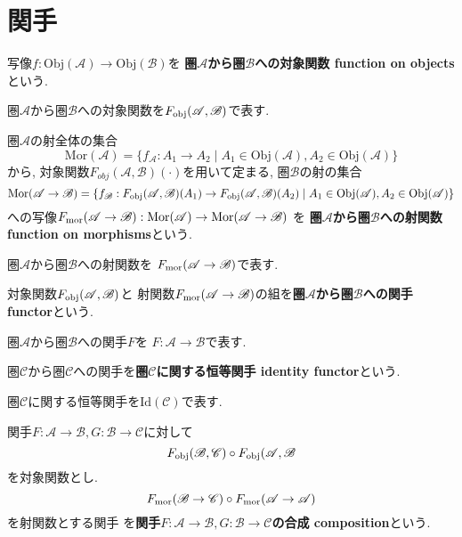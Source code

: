 \section{関手}
\begin{Def}
写像$f:\mathrm{Obj}(\mathscr{A})\rightarrow\mathrm{Obj}(\mathscr{B})$を
{\bf 圏$\mathscr{A}$から圏$\mathscr{B}$への対象関数 function on objects}という.
\end{Def}
\begin{Notation}
圏$\mathscr{A}$から圏$\mathscr{B}$への対象関数を$F_{\rm obj}(\mathscr{A},\mathscr{B})$で表す.
\end{Notation}
\begin{Def}
圏$\mathscr{A}$の射全体の集合\[\mathrm{Mor}(\mathscr{A})=\{f_{\mathscr{A}}:A_1\rightarrow A_2\mid A_1\in\mathrm{Obj}(\mathscr{A}),A_2\in\mathrm{Obj}(\mathscr{A})\}\]
から, 対象関数$F_{obj}(\mathscr{A},\mathscr{B})(\cdot)$を用いて定まる, 圏$\mathscr{B}$の射の集合
\[
\mathrm{Mor}(\mathscr{A}\rightarrow\mathscr{B})=\{f_{\mathscr{B}}:F_{\rm obj}(\mathscr{A},\mathscr{B})(A_1)\rightarrow
F_{\rm obj}(\mathscr{A},\mathscr{B})(A_2)\mid A_1\in\mathrm{Obj}(\mathscr{A}),A_2\in\mathrm{Obj}(\mathscr{A})\}
\]
への写像$F_{\rm mor}(\mathscr{A}\rightarrow\mathscr{B}):\mathrm{Mor}(\mathscr{A})\rightarrow\mathrm{Mor}(\mathscr{A}\rightarrow\mathscr{B})$
を
{\bf 圏$\mathscr{A}$から圏$\mathscr{B}$への射関数 function on morphisms}という.
\end{Def}
\begin{Notation}
圏$\mathscr{A}$から圏$\mathscr{B}$への射関数を
$F_{\rm mor}(\mathscr{A}\rightarrow\mathscr{B})$で表す.
\end{Notation}
\begin{Def}
対象関数$F_{\rm obj}(\mathscr{A},\mathscr{B})$と
射関数$F_{\rm mor}(\mathscr{A}\rightarrow\mathscr{B})$の組を{\bf 圏$\mathscr{A}$から圏$\mathscr{B}$への関手 functor}という.
\end{Def}
\begin{Notation}
圏$\mathscr{A}$から圏$\mathscr{B}$への関手$F$を
$F:\mathscr{A}\rightarrow\mathscr{B}$で表す.
\end{Notation}
\begin{Def}
圏$\mathscr{C}$から圏$\mathscr{C}$への関手を{\bf 圏$\mathscr{C}$に関する恒等関手 identity functor}という.
\end{Def}
\begin{Notation}
圏$\mathscr{C}$に関する恒等関手を$\mathrm{Id}(\mathscr{C})$で表す.
\end{Notation}
\begin{Def}
関手$F:\mathscr{A}\rightarrow\mathscr{B},G:\mathscr{B}\rightarrow\mathscr{C}$に対して
\[F_{\rm obj}(\mathscr{B},\mathscr{C})\circ F_{\rm obj}(\mathscr{A},\mathscr{B}\]
を対象関数とし.
\[F_{\rm mor}(\mathscr{B}\rightarrow\mathscr{C})\circ F_{\rm mor}(\mathscr{A}\rightarrow\mathscr{A})\]
を射関数とする関手
を{\bf 関手$F:\mathscr{A}\rightarrow\mathscr{B},G:\mathscr{B}\rightarrow\mathscr{C}$の合成 composition}という.
\end{Def}
